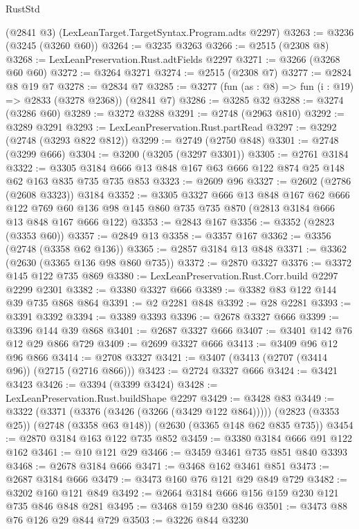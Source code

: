 \begin{lexlean}{RustStd}
\begin{coremodule}
    (@2841 @3)
    (LexLeanTarget.TargetSyntax.Program.adts @2297)
@3263 := @3236 (@3245 (@3260 @60))
@3264 := @3235 @3263
@3266 := @2515 (@2308 @8)
@3268 := LexLeanPreservation.Rust.adtFields @2297
@3271 := @3266 (@3268 @60 @60)
@3272 := @3264 @3271
@3274 := @2515 (@2308 @7)
@3277 := @2824 @8 @19 @7
@3278 := @2834 @7
@3285 := @3277 (fun (as : @8) => fun (i : @19) => @2833 (@3278 @2368)) (@2841 @7)
@3286 := @3285 @32
@3288 := @3274 (@3286 @60)
@3289 := @3272 @3288
@3291 := @2748 (@2963 @810)
@3292 := @3289 @3291
@3293 := LexLeanPreservation.Rust.partRead
@3297 := @3292 (@2748 (@3293 @822 @812))
@3299 := @2749 (@2750 @848)
@3301 := @2748 (@3299 @666)
@3304 := @3200 (@3205 (@3297 @3301))
@3305 := @2761 @3184
@3322 := @3305 @3184 @666 @13 @848 @167 @63 @666 @122 @874 @25 @148 @62 @163 @835 @735 @735 @853
@3323 := @2609 @96
@3327 := @2602 (@2786 (@2608 @3323)) @3184
@3352 := @3305
    @3327
    @666
    @13
    @848
    @167
    @62
    @666
    @122
    @769
    @60
    @136
    @98
    @145
    @860
    @735
    @735
    @870
    (@2813 @3184 @666 @13 @848 @167 @666 @122)
@3353 := @2843 @167
@3356 := @3352 (@2823 (@3353 @60))
@3357 := @2849 @13
@3358 := @3357 @167
@3362 := @3356 (@2748 (@3358 @62 @136))
@3365 := @2857 @3184 @13 @848
@3371 := @3362 (@2630 (@3365 @136 @98 @860 @735))
@3372 := @2870 @3327
@3376 := @3372 @145 @122 @735 @869
@3380 := LexLeanPreservation.Rust.Corr.build @2297 @2299 @2301
@3382 := @3380 @3327 @666
@3389 := @3382 @83 @122 @144 @39 @735 @868 @864
@3391 := @2 @2281 @848
@3392 := @28 @2281
@3393 := @3391 @3392
@3394 := @3389 @3393
@3396 := @2678 @3327 @666
@3399 := @3396 @144 @39 @868
@3401 := @2687 @3327 @666
@3407 := @3401 @142 @76 @12 @29 @866 @729
@3409 := @2699 @3327 @666
@3413 := @3409 @96 @12 @96 @866
@3414 := @2708 @3327
@3421 := @3407 (@3413 (@2707 (@3414 @96)) (@2715 (@2716 @866)))
@3423 := @2724 @3327 @666
@3424 := @3421 @3423
@3426 := @3394 (@3399 @3424)
@3428 := LexLeanPreservation.Rust.buildShape @2297
@3429 := @3428 @83
@3449 := @3322
    (@3371 (@3376 (@3426 (@3266 (@3429 @122 @864)))))
    (@2823 (@3353 @25))
    (@2748 (@3358 @63 @148))
    (@2630 (@3365 @148 @62 @835 @735))
@3454 := @2870 @3184 @163 @122 @735 @852
@3459 := @3380 @3184 @666 @91 @122 @162
@3461 := @10 @121 @29
@3466 := @3459 @3461 @735 @851 @840 @3393
@3468 := @2678 @3184 @666
@3471 := @3468 @162 @3461 @851
@3473 := @2687 @3184 @666
@3479 := @3473 @160 @76 @121 @29 @849 @729
@3482 := @3202 @160 @121 @849
@3492 := @2664 @3184 @666 @156 @159 @230 @121 @735 @846 @848 @281
@3495 := @3468 @159 @230 @846
@3501 := @3473 @88 @76 @126 @29 @844 @729
@3503 := @3226 @844 @3230

\end{coremodule}
\end{lexlean}
